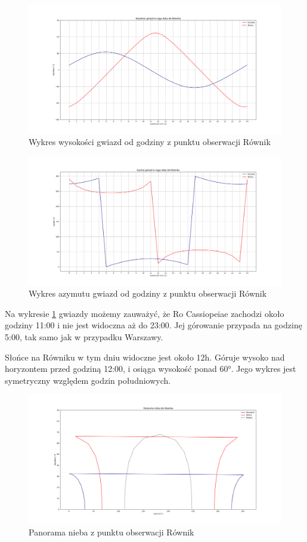 \documentclass[fleqn,10pt,a4paper]{article}
\begin{document}
\begin{figure}[h!]
  \centering
  \includegraphics[width=1\textwidth]{zdjecia/wys_gwiazd_r_inter.png}
  \caption{Wykres wysokości gwiazd od godziny z punktu obserwacji Równik}
  \label{h_r}
\end{figure}

\begin{figure}[h!]
  \centering
  \includegraphics[width=1\textwidth]{zdjecia/az_gwiazd_r.png}
  \caption{Wykres azymutu gwiazd od godziny z punktu obserwacji Równik}
  \label{az_r}
\end{figure}

Na wykresie \ref{h_r} gwiazdy możemy zauważyć, 
że Ro Cassiopeiae zachodzi około godziny 11:00 i nie jest widoczna aż do 23:00. Jej górowanie przypada na godzinę 5:00,
tak samo jak w przypadku Warszawy.

Słońce na Równiku w tym dniu widoczne jest około 12h. Góruje wysoko nad horyzontem przed godziną 12:00, i osiąga wysokość ponad 60°.
Jego wykres jest symetryczny względem godzin południowych.

\newpage
\begin{figure}[h!]
  \centering
  \includegraphics[width=1\textwidth]{zdjecia/panorama_r_b.png}
  \caption{Panorama nieba z punktu obserwacji Równik}
  \label{zjdecia/panorama_r}
\end{figure}
\clearpage
\newpage
\end{document}
